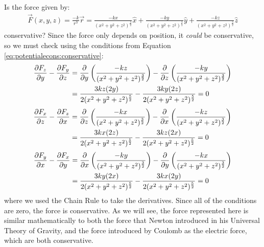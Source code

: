 \begin{example}{Is the force given by:
\begin{align*}
\vec F(x,y,z) = \frac{-k}{r^3}\vec r = \frac{-kx}{(x^2+y^2+z^2)^\frac{3}{2}}\hat x + \frac{-ky}{(x^2+y^2+z^2)^\frac{3}{2}}\hat y + \frac{-kz}{(x^2+y^2+z^2)^\frac{3}{2}}\hat z
\end{align*}
conservative?}
Since the force only depends on position, it \textit{could} be conservative, so we must check using the conditions from Equation \ref{eq:potentialecons:conservative}:
\begin{align*}
\frac{\partial F_z}{\partial y}-\frac{\partial F_y}{\partial z} &= \frac{\partial }{\partial y}\left(\frac{-kz}{(x^2+y^2+z^2)^\frac{3}{2}}\right)-\frac{\partial }{\partial z}\left( \frac{-ky}{(x^2+y^2+z^2)^\frac{3}{2}}\right)\\
&=\frac{3kz(2y)}{2(x^2+y^2+z^2)^\frac{5}{2}}-\frac{3ky(2z)}{2(x^2+y^2+z^2)^\frac{5}{2}} = 0
\end{align*}
\begin{align*}
\frac{\partial F_x}{\partial z}-\frac{\partial F_z}{\partial x} &= \frac{\partial }{\partial z}\left(\frac{-kx}{(x^2+y^2+z^2)^\frac{3}{2}}\right)-\frac{\partial }{\partial x}\left( \frac{-kz}{(x^2+y^2+z^2)^\frac{3}{2}}\right)\\
&=\frac{3kx(2z)}{2(x^2+y^2+z^2)^\frac{5}{2}}-\frac{3kz(2x)}{2(x^2+y^2+z^2)^\frac{5}{2}} = 0
\end{align*}
\begin{align*}
\frac{\partial F_y}{\partial x}-\frac{\partial F_x}{\partial y} &= \frac{\partial }{\partial x}\left(\frac{-ky}{(x^2+y^2+z^2)^\frac{3}{2}}\right)-\frac{\partial }{\partial y}\left( \frac{-kx}{(x^2+y^2+z^2)^\frac{3}{2}}\right)\\
&=\frac{3ky(2x)}{2(x^2+y^2+z^2)^\frac{5}{2}}-\frac{3kx(2y)}{2(x^2+y^2+z^2)^\frac{5}{2}} = 0
\end{align*}
where we used the Chain Rule to take the derivatives. Since all of the conditions are zero, the force is conservative. As we will see, the force represented here is similar mathematically to both the force that Newton introduced in his Universal Theory of Gravity, and the force introduced by Coulomb as the electric force, which are both conservative.
\end{example}

